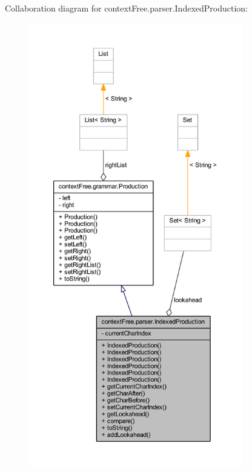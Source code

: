 Collaboration diagram for context\-Free.\-parser.\-Indexed\-Production\-:\nopagebreak
\begin{figure}[H]
\begin{center}
\leavevmode
\includegraphics[height=550pt]{classcontext_free_1_1parser_1_1_indexed_production__coll__graph}
\end{center}
\end{figure}
